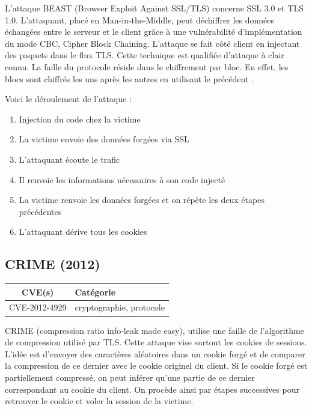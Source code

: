 L'attaque BEAST (Browser Exploit Against SSL/TLS) concerne SSL 3.0 et TLS 1.0. L'attaquant, placé en Man-in-the-Middle, peut déchiffrer les données échangées entre le serveur et le client grâce à une vulnérabilité d'implémentation du mode CBC, Cipher Block Chaining. L'attaque se fait côté client en injectant des paquets dans le flux TLS. Cette technique est qualifiée d'attaque à clair connu. La faille du protocole réside dans le chiffrement par bloc. En effet, les blocs sont chiffrés les uns après les autres en utilisant le précédent \cite{beast}.

Voici le déroulement de l'attaque :

\begin{enumerate}
\item Injection du code chez la victime
\item La victime envoie des données forgées via SSL
\item L'attaquant écoute le trafic
\item Il renvoie les informations nécessaires à son code injecté
\item La victime renvoie les données forgées et on répète les deux étapes précédentes
  \item L'attaquant dérive tous les cookies
\end{enumerate}



\subsection{CRIME (2012)}

\begin{tabularx}{0.96\textwidth}{|c|X|}
  \hline
  \textbf{CVE(s)} & \textbf{Catégorie} \\
  \hline
  CVE-2012-4929 & cryptographie, protocole \\
  \hline
\end{tabularx}

\vspace{1em}

CRIME (compression ratio info-leak made easy), utilise une faille de l'algorithme de compression utilisé par TLS. Cette attaque vise surtout les cookies de sessions. L'idée est d'envoyer des caractères aléatoires dans un cookie forgé et de comparer la compression de ce dernier avec le cookie originel du client. Si le cookie forgé est partiellement compressé, on peut inférer qu'une partie de ce dernier correspondant au cookie du client. On procède ainsi par étapes successives pour retrouver le cookie et voler la session de la victime.

